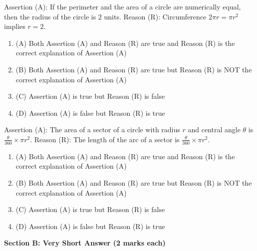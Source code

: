 \documentclass[12pt,a4paper]{exam}
\begin{document}
\begin{questions}
\question[1] Assertion (A): If the perimeter and the area of a circle are numerically equal, then the radius of the circle is $2$ units. Reason (R): Circumference $2\pi r = \pi r^2$ implies $r=2$.
\begin{enumerate}[label=(\Alph*)]
  \item (A) Both Assertion (A) and Reason (R) are true and Reason (R) is the correct explanation of Assertion (A)
  \item (B) Both Assertion (A) and Reason (R) are true but Reason (R) is NOT the correct explanation of Assertion (A)
  \item (C) Assertion (A) is true but Reason (R) is false
  \item (D) Assertion (A) is false but Reason (R) is true
\end{enumerate}
\vspace{0.15cm}

\question[1] Assertion (A): The area of a sector of a circle with radius $r$ and central angle $\theta$ is $\frac{\theta}{360} \times \pi r^2$. Reason (R): The length of the arc of a sector is $\frac{\theta}{360} \times \pi r^2$.
\begin{enumerate}[label=(\Alph*)]
  \item (A) Both Assertion (A) and Reason (R) are true and Reason (R) is the correct explanation of Assertion (A)
  \item (B) Both Assertion (A) and Reason (R) are true but Reason (R) is NOT the correct explanation of Assertion (A)
  \item (C) Assertion (A) is true but Reason (R) is false
  \item (D) Assertion (A) is false but Reason (R) is true
\end{enumerate}
\vspace{0.15cm}

\end{questions}
\bigskip
\noindent\textbf{\large Section B: Very Short Answer (2 marks each)}
\end{document}
